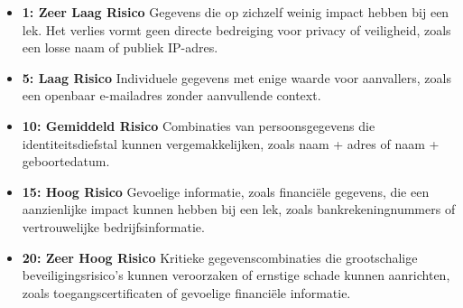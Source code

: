 \begin{itemize}
    \item \textbf{1: Zeer Laag Risico} Gegevens die op zichzelf weinig impact hebben bij een lek. Het verlies vormt geen directe bedreiging voor privacy of veiligheid, zoals een losse naam of publiek IP-adres.
    \item \textbf{5: Laag Risico} Individuele gegevens met enige waarde voor aanvallers, zoals een openbaar e-mailadres zonder aanvullende context.
    \item \textbf{10: Gemiddeld Risico} Combinaties van persoonsgegevens die identiteitsdiefstal kunnen vergemakkelijken, zoals naam + adres of naam + geboortedatum.
    \item \textbf{15: Hoog Risico} Gevoelige informatie, zoals financiële gegevens, die een aanzienlijke impact kunnen hebben bij een lek, zoals bankrekeningnummers of vertrouwelijke bedrijfsinformatie.
    \item \textbf{20: Zeer Hoog Risico} Kritieke gegevenscombinaties die grootschalige beveiligingsrisico's kunnen veroorzaken of ernstige schade kunnen aanrichten, zoals toegangscertificaten of gevoelige financiële informatie.
\end{itemize}
